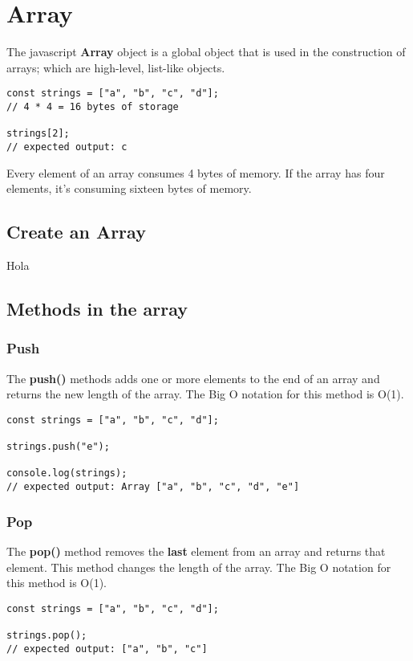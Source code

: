 \section{Array}
The javascript \textbf{Array} object is a global object that is used in the construction of arrays; which are high-level, list-like objects.
\begin{lstlisting}
const strings = ["a", "b", "c", "d"];
// 4 * 4 = 16 bytes of storage

strings[2]; 
// expected output: c
\end{lstlisting}
Every element of an array consumes 4 bytes of memory. If the array has four elements, it's consuming sixteen bytes of memory.

\subsection{Create an Array}

Hola
\subsection{Methods in the array}

\subsubsection{Push}
The \textbf{push()} methods adds one or more elements to the end of an array and returns the new length of the array. The Big O notation for this method is O(1).
\begin{lstlisting}
const strings = ["a", "b", "c", "d"];

strings.push("e");

console.log(strings); 
// expected output: Array ["a", "b", "c", "d", "e"]
\end{lstlisting}


\subsubsection{Pop}
The \textbf{pop()} method removes the \textbf{last} element from an array and returns that element. This method changes the length of the array. The Big O notation for this method is O(1).

\begin{lstlisting}
const strings = ["a", "b", "c", "d"];

strings.pop();
// expected output: ["a", "b", "c"]
\end{lstlisting}

